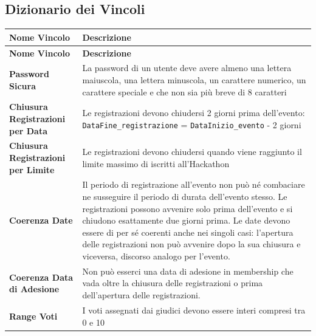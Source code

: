 \documentclass[a4paper, 11pt]{article}
\renewcommand{\arraystretch}{1.2} %
\begin{document}
	\subsection{Dizionario dei Vincoli}
	{\footnotesize
		\setlength{\arrayrulewidth}{0.5pt}
		\renewcommand{\arraystretch}{1.5}
		\begin{longtable}{
				>{\raggedright\arraybackslash}p{5.5cm}
				>{\raggedright\arraybackslash}p{10cm}
			}
			\hline
			\textbf{Nome Vincolo} & \textbf{Descrizione} \\
			\hline
			\endfirsthead
			\hline
			\textbf{Nome Vincolo} & \textbf{Descrizione} \\
			\hline
			\endhead
			\hline
			\endfoot
			\hline
			\endlastfoot
			
			\textbf{Password Sicura} &
			La password di un utente deve avere almeno una lettera maiuscola, una lettera minuscola, un carattere numerico, un carattere speciale e che non sia più breve di 8 caratteri \\
			\hline
			
			\textbf{Chiusura Registrazioni per Data} &
			Le registrazioni devono chiudersi 2 giorni prima dell'evento:
			\texttt{DataFine\_registrazione} = \texttt{DataInizio\_evento} - 2 giorni \\
			\hline
			
			\textbf{Chiusura Registrazioni per Limite} &
			Le registrazioni devono chiudersi quando viene raggiunto il limite massimo di iscritti all'Hackathon \\
			\hline
			
			\textbf{Coerenza Date} &
			Il periodo di registrazione all'evento non può né combaciare ne susseguire il periodo di durata dell'evento stesso.
			Le registrazioni possono avvenire solo prima dell'evento e si chiudono esattamente due giorni prima.
			Le date devono essere di per sé coerenti anche nei singoli casi: l'apertura delle registrazioni non può avvenire dopo
			la sua chiusura e viceversa, discorso analogo per l'evento.\\
			\hline
			
			\textbf{Coerenza Data di Adesione} &
			Non può esserci una data di adesione in membership che vada oltre la chiusura delle registrazioni o prima dell'apertura delle registrazioni.\\
			\hline
			
			\textbf{Range Voti} &
			I voti assegnati dai giudici devono essere interi compresi tra 0 e 10\\
			\hline
			

\end{longtable}}
\end{document}
